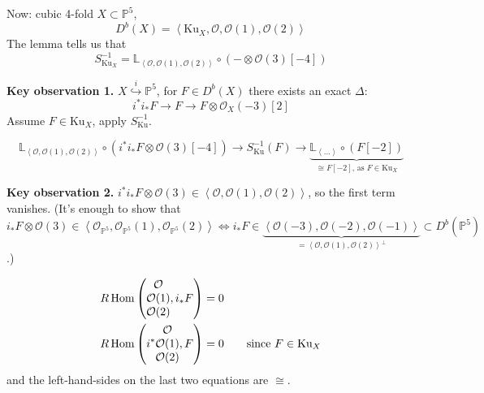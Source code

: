 Now: cubic 4-fold $X \subset \mathbb{P}^5$,
$$
D^b(X)=\left\langle{}\text{Ku}_X,\mathcal{O},
\mathcal{O}(1),\mathcal{O}(2)\right\rangle{}
$$
The lemma tells us that
$$
S_{\text{Ku}_X}^{-1}
=\mathbb{L}_{\left\langle{}\mathcal{O},\mathcal{O}(1)
,
\mathcal{O}(2)\right\rangle{}}
\circ (- \otimes \mathcal{O}(3)[-4])
$$

\medskip\noindent
{\bf Key observation 1.}
$X\overset{i}{\hookrightarrow}\mathbb{P}^5$,
for $F \in D^b(X)$ there exists an exact
$\Delta$:
$$
i^*i_*F \to F \to F \otimes
\mathcal{O}_X(-3)[2]
$$
Assume $F \in \text{Ku}_X$, apply
$S^{-1}_{\text{Ku}}$.

$$
\mathbb{L}_{\left\langle{}\mathcal{O},\mathcal{O}(1),
\mathcal{O}(2)\right\rangle{}}
\circ (i^* i_* F \otimes \mathcal{O}(3)[-4])
\to S_{\text{Ku}}^{-1}(F)
\to
\underbrace{\mathbb{L}_{\left\langle{}\ldots\right\rangle{}}
\circ(F[-2])}
_{\cong F[-2]\text{, as }F\in \text{Ku}_X}
$$

\medskip\noindent
{\bf Key observation 2.} $i^*i_*F \otimes
\mathcal{O}(3) \in
\left\langle{}\mathcal{O},\mathcal{O}(1),\mathcal{O}
(2)\right\rangle{}$,
so the first term
vanishes. (It's enough to show that $i_*F
\otimes \mathcal{O}(3) \in
\left\langle{}\mathcal{O}_{\mathbb{P}^5},\mathcal{O}
_{\mathbb{P}^5}(1),
\mathcal{O}_{\mathbb{P}^5}(2)\right\rangle{}
\iff i_*F \in
\underbrace{\left\langle{}\mathcal{O}(-3),\mathcal{O}
(-2),\mathcal{O}(-1)\right\rangle{}}
_{=\left\langle{}\mathcal{O},\mathcal{O}(1),
\mathcal{O}(2)\right\rangle{}^\perp}
\subset D^b(\mathbb{P}^5)$.)

\begin{align*}
R\mathop{\mathrm{Hom}}\nolimits\left(
\begin{matrix}
\mathcal{O}\\ \mathcal{O}(1)\\ \mathcal{O}(2)
\end{matrix},i_*F
\right)&=0
\\
R\mathop{\mathrm{Hom}}\nolimits\left(
i^*\begin{matrix}
\mathcal{O}\\ \mathcal{O}(1)\\ \mathcal{O}(2)
\end{matrix},F
\right)&=0\qquad \text{since $F \in
\text{Ku}_X$}
\end{align*}
and the left-hand-sides on the last two
equations are $\cong$.

